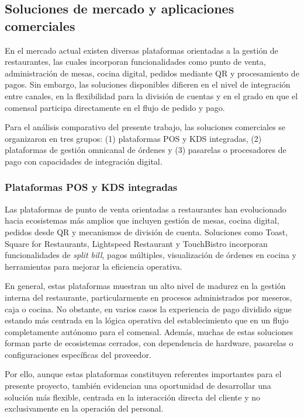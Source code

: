 \documentclass[12pt]{report}
\begin{document}
\subsection{Soluciones de mercado y aplicaciones comerciales}

En el mercado actual existen diversas plataformas orientadas a la gestión de restaurantes, las cuales incorporan funcionalidades como punto de venta, administración de mesas, cocina digital, pedidos mediante QR y procesamiento de pagos. Sin embargo, las soluciones disponibles difieren en el nivel de integración entre canales, en la flexibilidad para la división de cuentas y en el grado en que el comensal participa directamente en el flujo de pedido y pago.

Para el análisis comparativo del presente trabajo, las soluciones comerciales se organizaron en tres grupos: (1) plataformas POS y KDS integradas, (2) plataformas de gestión omnicanal de órdenes y (3) pasarelas o procesadores de pago con capacidades de integración digital.

\subsubsection{Plataformas POS y KDS integradas}

Las plataformas de punto de venta orientadas a restaurantes han evolucionado hacia ecosistemas más amplios que incluyen gestión de mesas, cocina digital, pedidos desde QR y mecanismos de división de cuenta. Soluciones como Toast, Square for Restaurants, Lightspeed Restaurant y TouchBistro incorporan funcionalidades de \textit{split bill}, pagos múltiples, visualización de órdenes en cocina y herramientas para mejorar la eficiencia operativa.

En general, estas plataformas muestran un alto nivel de madurez en la gestión interna del restaurante, particularmente en procesos administrados por meseros, caja o cocina. No obstante, en varios casos la experiencia de pago dividido sigue estando más centrada en la lógica operativa del establecimiento que en un flujo completamente autónomo para el comensal. Además, muchas de estas soluciones forman parte de ecosistemas cerrados, con dependencia de hardware, pasarelas o configuraciones específicas del proveedor.

Por ello, aunque estas plataformas constituyen referentes importantes para el presente proyecto, también evidencian una oportunidad de desarrollar una solución más flexible, centrada en la interacción directa del cliente y no exclusivamente en la operación del personal.
\end{document}
